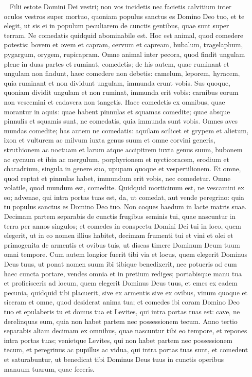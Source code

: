 \begin{biblechapter}  
\verse Filii estote Domini Dei vestri; non vos incidetis nec facietis calvitium inter oculos vestros super mortuo, 
\verse quoniam populus sanctus es Domino Deo tuo, et te elegit, ut sis ei in populum peculiarem de cunctis gentibus, quae sunt super terram. 
\verse Ne comedatis quidquid abominabile est. 
\verse Hoc est animal, quod comedere potestis: bovem et ovem et capram, 
\verse cervum et capream, bubalum, tragelaphum, pygargum, orygem, rupicapram. 
\verse Omne animal inter pecora, quod findit ungulam plene in duas partes et ruminat, comedetis; 
\verse de his autem, quae ruminant et ungulam non findunt, haec comedere non debetis: camelum, leporem, hyracem, quia ruminant et non dividunt ungulam, immunda erunt vobis. 
\verse Sus quoque, quoniam dividit ungulam et non ruminat, immunda erit vobis: carnibus eorum non vescemini et cadavera non tangetis. 
\verse Haec comedetis ex omnibus, quae morantur in aquis: quae habent pinnulas et squamas comedite; 
\verse quae absque pinnulis et squamis sunt, ne comedatis, quia immunda sunt vobis. 
\verse Omnes aves mundas comedite; 
\verse has autem ne comedatis: aquilam scilicet et grypem et alietum, 
\verse ixon et vulturem ac milvum iuxta genus suum 
\verse et omne corvini generis, 
\verse struthionem ac noctuam et larum atque accipitrem iuxta genus suum, 
\verse bubonem ac cycnum et ibin 
\verse ac mergulum, porphyrionem et nycticoracem, 
\verse erodium et charadrium, singula in genere suo, upupam quoque et vespertilionem. 
\verse Et omne, quod reptat et pinnulas habet, immundum erit vobis, nec comedetur. 
\verse Omne volatile, quod mundum est, comedite. 
\verse Quidquid morticinum est, ne vescamini ex eo; advenae, qui intra portas tuas est, da, ut comedat, aut vende peregrino: quia tu populus sanctus es Domino Deo tuo. Non coques haedum in lacte matris suae. 
\verse Decimam partem separabis de cunctis frugibus seminis tui, quae nascuntur in terra per annos singulos; 
\verse et comedes in conspectu Domini Dei tui in loco, quem elegerit, ut in eo nomen illius habitet, decimam frumenti tui et vini et olei et primogenita de armentis et ovibus tuis, ut discas timere Dominum Deum tuum omni tempore. 
\verse Cum autem longior fuerit tibi via et locus, quem elegerit Dominus Deus tuus, ut ponat nomen suum ibi tibique benedixerit, nec potueris ad eum haec cuncta portare, 
\verse vendes omnia et in pretium rediges; portabisque manu tua et proficisceris ad locum, quem elegerit Dominus Deus tuus, 
\verse et emes ex eadem pecunia, quidquid tibi placuerit, sive ex armentis sive ex ovibus, vinum quoque et siceram et omne, quod desiderat anima tua; et comedes ibi coram Domino Deo tuo et epulaberis tu et domus tua 
\verse et Levites, qui intra portas tuas est: cave, ne derelinquas eum, quia non habet partem nec possessionem tecum. 
\verse Anno tertio separabis aliam decimam ex omnibus, quae nascuntur tibi eo tempore, et repones intra portas tuas; 
\verse venietque Levites, qui non habet partem nec possessionem tecum, et peregrinus ac pupillus ac vidua, qui intra portas tuas sunt, et comedent et saturabuntur, ut benedicat tibi Dominus Deus tuus in cunctis operibus manuum tuarum, quae feceris. 
\end{biblechapter}

